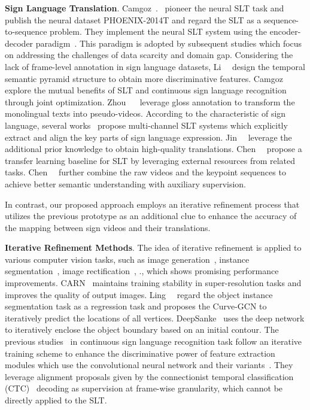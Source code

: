 \documentclass[10pt,twocolumn,letterpaper]{article}
\begin{document}
\smallskip
\noindent \textbf{Sign Language Translation}. 
Camgoz~\etal.~\cite{camgoz2018neural} pioneer the neural SLT task and publish the neural dataset PHOENIX-2014T and regard the SLT as a sequence-to-sequence problem.
They implement the neural SLT system using the encoder-decoder paradigm~\cite{bahdanau2014neural}. 
This paradigm is adopted by subsequent studies which focus on addressing the challenges of data scarcity and domain gap. 
Considering the lack of frame-level annotation in sign language datasets, Li~\etal~\cite{li2020tspnet} design the temporal semantic pyramid structure to obtain more discriminative features. 
Camgoz~\etal~\cite{camgoz2020sign} explore the mutual benefits of SLT and continuous sign language recognition through joint optimization. Zhou ~\etal~\cite{zhou2021improving} leverage gloss annotation to transform the monolingual texts into pseudo-videos. According to the characteristic of sign language, several works~\cite{yin2020better,camgoz2020multi,zhou2021spatial} propose multi-channel SLT systems which explicitly extract and align the key parts of sign language expression. Jin~\etal~\cite{jin2022prior} leverage the additional prior knowledge to obtain high-quality translations. 
Chen~\etal~\cite{chen2022simple} propose a transfer learning baseline for SLT by leveraging external resources from related tasks.
Chen~\etal~\cite{chen2022two} further combine the raw videos and the keypoint sequences to achieve better semantic understanding with auxiliary supervision.

In contrast, our proposed approach employs an iterative refinement process that utilizes the previous prototype as an additional clue to enhance the accuracy of the mapping between sign videos and their translations.

\smallskip
\noindent \textbf{Iterative Refinement Methods}.
The idea of iterative refinement is applied to various computer vision tasks, such as image generation~\cite{ahn2018image,gregor2015draw,ren2019progressive}, instance segmentation~\cite{peng2020deep,ling2019fast,liu2021dance,zhang2022e2ec}, image rectification~\cite{feng2021docscanner}, \etc., which shows promising performance improvements. CARN~\cite{ahn2018image} maintains training stability in super-resolution tasks and improves the quality of output images. Ling~\etal~\cite{ling2019fast} regard the object instance segmentation task as a regression task and proposes the Curve-GCN to iteratively predict the locations of all vertices. DeepSanke~\cite{peng2020deep} uses the deep network to iteratively enclose the object boundary based on an initial contour.
The previous studies~\cite{zhou2019dynamic,pu2018dilated,cui2019deep,pu2019iterative,min2021visual} in continuous sign language recognition  task follow an iterative training scheme to enhance the discriminative power of feature extraction modules which use the convolutional neural network and their variants~\cite{carreira2017quo, ji20123d, simonyan2014two}. They leverage alignment proposals given by the connectionist temporal classification (CTC)~\cite{graves2006connectionist} decoding as supervision at frame-wise granularity, which cannot be directly applied to the SLT. 
\end{document}
